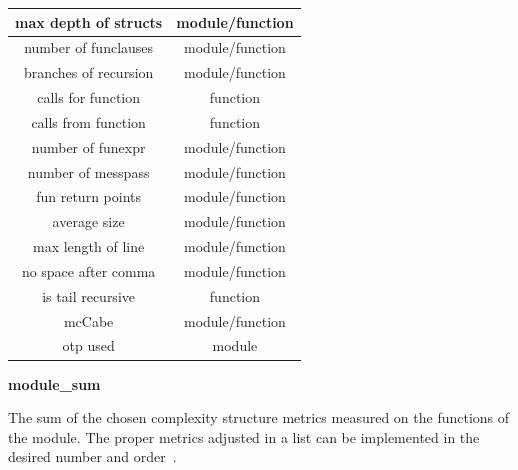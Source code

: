 \begin{table}[!htb]
{\begin{tabular}{|c|c|}
		  	\hline
		  	max depth of structs		& module/function		  			  
		  	\\		  			

		  	\hline
		  	number of funclauses		& module/function		  			  
		  	\\			
	
		  	\hline
		  	branches of recursion		& module/function		  			  
		  	\\			

		  	\hline
		  	calls for function			& function		  			  
		  	\\			
			
		  	\hline
		  	calls from function			& function		  			  
		  	\\	

		  	\hline
		  	number of funexpr			& module/function		  			  
		  	\\
		  	
		  	\hline
		  	number of messpass			& module/function		  			  
		  	\\		  	

		  	\hline
		  	fun return points			& module/function		  			  
		  	\\	
		  	
		  	\hline
		  	average size				& module/function		  			  
		  	\\		  		  	

		  	\hline
		  	max length of line			& module/function		  			  
		  	\\
		  	
		  	\hline
		  	no space after comma		& module/function		  			  
		  	\\	
		  	
		  	\hline
		  	is tail recursive			& function		  			  
		  	\\		  	

		  	\hline
		  	mcCabe						& module/function		  			  
		  	\\	
		  			  	
		  	\hline
		  	otp used						& module		  			  
		  	\\			  	
		  	\hline		  		  			  				
		\end{tabular}}
	\end{table}

\textbf{module\_sum}

The sum of the chosen complexity structure metrics measured on the functions of the module. The proper metrics adjusted in a list can be implemented in the desired number and order~\cite{refactorerlm}.

